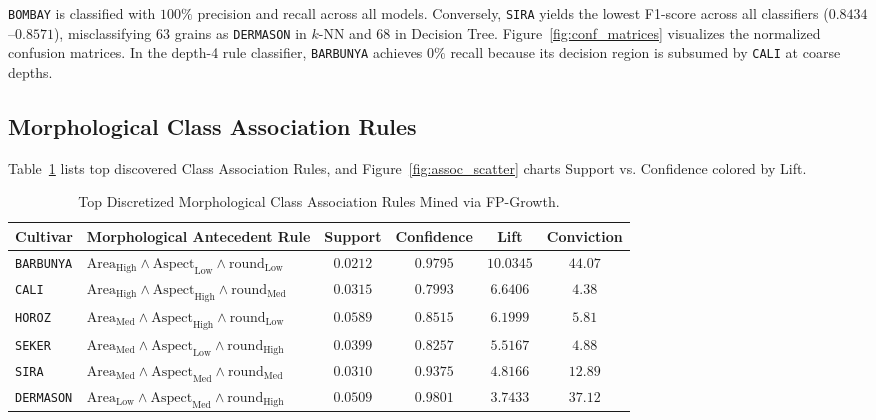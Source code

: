\documentclass[11pt,a4paper]{article}
\begin{document}
\texttt{BOMBAY} is classified with $100\%$ precision and recall across all models. Conversely, \texttt{SIRA} yields the lowest F1-score across all classifiers ($0.8434$--$0.8571$), misclassifying $63$ grains as \texttt{DERMASON} in $k$-NN and $68$ in Decision Tree. Figure~\ref{fig:conf_matrices} visualizes the normalized confusion matrices. In the depth-4 rule classifier, \texttt{BARBUNYA} achieves $0\%$ recall because its decision region is subsumed by \texttt{CALI} at coarse depths.

\subsection{Morphological Class Association Rules}
\label{subsec:res_association}

Table~\ref{tab:assoc_rules} lists top discovered Class Association Rules, and Figure~\ref{fig:assoc_scatter} charts Support vs. Confidence colored by Lift.

\begin{table}[htbp]
    \centering
    \small
    \caption{Top Discretized Morphological Class Association Rules Mined via FP-Growth.}
    \label{tab:assoc_rules}
    \setlength{\tabcolsep}{4.5pt}
    \begin{tabularx}{\linewidth}{@{} l >{\raggedright\arraybackslash}X cccc @{}}
        \toprule
        \textbf{Cultivar} & \textbf{Morphological Antecedent Rule} & \textbf{Support} & \textbf{Confidence} & \textbf{Lift} & \textbf{Conviction} \\
        \midrule
        \texttt{BARBUNYA} & $\text{Area}_{\text{High}} \land \text{Aspect}_{\text{Low}} \land \text{round}_{\text{Low}}$ & $0.0212$ & $\mathbf{0.9795}$ & $\mathbf{10.0345}$ & $44.07$ \\
        \texttt{CALI} & $\text{Area}_{\text{High}} \land \text{Aspect}_{\text{High}} \land \text{round}_{\text{Med}}$ & $0.0315$ & $0.7993$ & $6.6406$ & $4.38$ \\
        \texttt{HOROZ} & $\text{Area}_{\text{Med}} \land \text{Aspect}_{\text{High}} \land \text{round}_{\text{Low}}$ & $0.0589$ & $0.8515$ & $6.1999$ & $5.81$ \\
        \texttt{SEKER} & $\text{Area}_{\text{Med}} \land \text{Aspect}_{\text{Low}} \land \text{round}_{\text{High}}$ & $0.0399$ & $0.8257$ & $5.5167$ & $4.88$ \\
        \texttt{SIRA} & $\text{Area}_{\text{Med}} \land \text{Aspect}_{\text{Med}} \land \text{round}_{\text{Med}}$ & $0.0310$ & $0.9375$ & $4.8166$ & $12.89$ \\
        \texttt{DERMASON} & $\text{Area}_{\text{Low}} \land \text{Aspect}_{\text{Med}} \land \text{round}_{\text{High}}$ & $0.0509$ & $0.9801$ & $3.7433$ & $37.12$ \\
        \bottomrule
    \end{tabularx}
\end{table}
\end{document}

